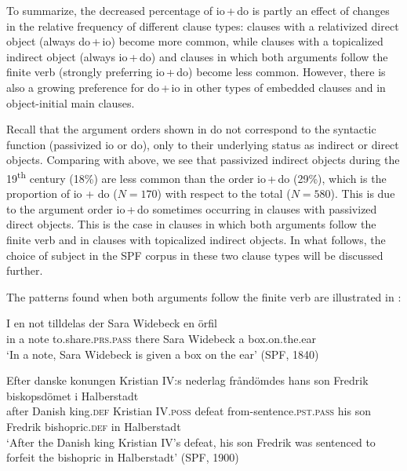 \documentclass[output=paper]{langscibook}
\begin{document}
To summarize, the decreased percentage of io\,+\,do is partly an effect of changes in the relative frequency of different clause types: clauses with a relativized direct object (always do\,+\,io) become more common, while clauses with a topicalized indirect object (always io\,+\,do) and clauses in which both arguments follow the finite verb (strongly preferring io\,+\,do) become less common. However, there is also a growing preference for do\,+\,io in other types of embedded clauses and in object-initial main clauses.



Recall that the argument orders shown in  do not correspond to the syntactic function (passivized io or do), only to their underlying status as indirect or direct objects. Comparing with  above, we see that passivized indirect objects during the 19\textsuperscript{th} century (18\%) are less common than the order io\,+\,do (29\%), which is the proportion of  io + do ($N=170$) with respect to the total ($N=580$). This is due to the argument order io\,+\,do sometimes occurring in clauses with passivized direct objects. This is the case in clauses in which both arguments follow the finite verb and in clauses with topicalized indirect objects. In what follows, the choice of subject in the SPF corpus in these two clause types will be discussed further.



The patterns found when both arguments follow the finite verb are illustrated in :


\ea%
    \label{ex:falk:20}
\ea\label{ex:falk:20a}
\gll I  en  not  tilldelas            der  Sara  Widebeck  en  örfil\\
      in  a  note  to.share\textsc{.prs}.\textsc{pass}    there  Sara  Widebeck  a  box.on.the.ear\\
\glt ‘In a note, Sara Widebeck is given a box on the ear’ (SPF, 1840)

\ex\label{ex:falk:20b}
\gll Efter  danske  konungen  Kristian IV:s    nederlag  fråndömdes      hans  son  Fredrik  biskopsdömet  i  Halberstadt\\
after  Danish  king.\textsc{def}    Kristian IV.\textsc{poss}  defeat      from-sentence.\textsc{pst}.\textsc{pass}      his   son  Fredrik  bishopric.\textsc{def}  in  Halberstadt\\
\glt ‘After the Danish king Kristian IV’s defeat, his son Fredrik was sentenced to forfeit the bishopric in Halberstadt’ (SPF, 1900)
\end{document}
